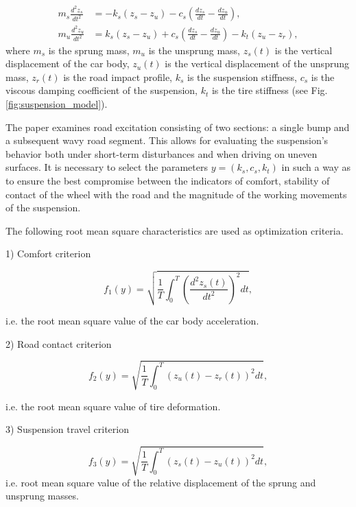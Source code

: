 \documentclass[a4paper]{llncs}
\begin{document}
\begin{align}
m_{s}\frac{d^{2}z_{s}}{dt^{2}} &= - k_{s}\left( z_{s} - z_{u} \right) - c_{s}\left( \frac{dz_{s}}{dt}-\frac{dz_{u}}{dt} \right), \label{eq:motion_sprung} \\
m_{u}\frac{d^{2}z_{u}}{dt^{2}} &= k_{s}\left( z_{s} - z_{u} \right) + c_{s}\left( \frac{dz_{s}}{dt}-\frac{dz_{u}}{dt} \right) - k_{t}\left( z_{u} - z_{r} \right), \label{eq:motion_unsprung}
\end{align}
where $m_{s}$ is the sprung mass, $m_{u}$ is the unsprung mass, $z_{s}(t)$ is the vertical displacement of the car body, $z_{u}(t)$ is the vertical displacement of the unsprung mass, $z_{r}(t)$ is the road impact profile, $k_{s}$ is the suspension stiffness, $c_{s}$ is the viscous damping coefficient of the suspension, $k_{t}$ is the tire stiffness (see Fig. \ref{fig:suspension_model}).

The paper examines road excitation consisting of two sections: a single bump and a subsequent wavy road segment. This allows for evaluating the suspension's behavior both under short-term disturbances and when driving on uneven surfaces. It is necessary to select the parameters $y = (k_{s},c_{s},k_{t})$ in such a way as to ensure the best compromise between the indicators of comfort, stability of contact of the wheel with the road and the magnitude of the working movements of the suspension.

The following root mean square characteristics are used as optimization criteria.

1) Comfort criterion

\begin{equation}
f_{1}(y) = \sqrt{\frac{1}{T}\int_{0}^{T}\left( \frac{d^{2}z_{s}(t)}{dt^{2}} \right)^{2}dt},
\label{eq:comfort}
\end{equation}

i.e. the root mean square value of the car body acceleration.

2) Road contact criterion

\begin{equation}
f_{2}(y) = \sqrt{\frac{1}{T}\int_{0}^{T}\left( z_{u}(t) - z_{r}(t) \right)^{2}dt},
\label{eq:road_contact}
\end{equation}

i.e. the root mean square value of tire deformation.

3) Suspension travel criterion

\begin{equation}
f_{3}(y) = \sqrt{\frac{1}{T}\int_{0}^{T}\left( z_{s}(t) - z_{u}(t) \right)^{2}dt},
\label{eq:suspension_travel}
\end{equation}
i.e. root mean square value of the relative displacement of the sprung and unsprung masses.
\end{document}
